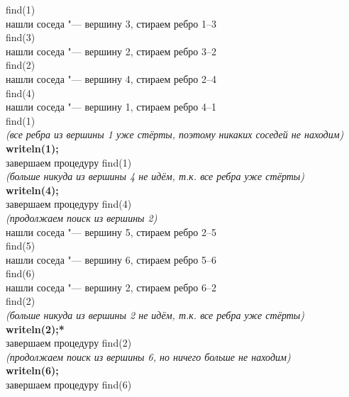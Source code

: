 {\newcommand{\ind}{\hspace*{1cm}}\footnotesize\noindent
find(1)\\
нашли соседа "--- вершину 3, стираем ребро 1--3\\
\ind find(3)\\
\ind нашли соседа "--- вершину 2, стираем ребро 3--2\\
\ind \ind find(2)\\
\ind \ind нашли соседа "--- вершину 4, стираем ребро 2--4\\
\ind \ind \ind find(4)\\
\ind \ind \ind нашли соседа "--- вершину 1, стираем ребро 4--1\\
\ind \ind \ind \ind find(1)\\
\ind \ind \ind \ind \textit{(все ребра из вершины 1 уже стёрты, поэтому 
                                      никаких соседей не находим)}\\
\ind \ind \ind \ind \textbf{writeln(1);}\\
\ind \ind \ind \ind завершаем процедуру find(1)\\
\ind \ind \ind \textit{(больше никуда из вершины 4 не идём, т.к. все ребра уже стёрты)}\\
\ind \ind \ind \textbf{writeln(4);}\\
\ind \ind \ind завершаем процедуру find(4)\\
\ind \ind \textit{(продолжаем поиск из вершины 2)}\\
\ind \ind нашли соседа "--- вершину 5, стираем ребро 2--5\\
\ind \ind \ind find(5)\\
\ind \ind \ind нашли соседа "--- вершину 6, стираем ребро 5--6\\
\ind \ind \ind \ind find(6)\\
\ind \ind \ind \ind нашли соседа "--- вершину 2, стираем ребро 6--2\\
\ind \ind \ind \ind \ind find(2)\\
\ind \ind \ind \ind \ind \textit{(больше никуда из вершины 2 не идём, т.к. все ребра уже стёрты)}\\
\ind \ind \ind \ind \ind \textbf{writeln(2);*}\\
\ind \ind \ind \ind \ind завершаем процедуру find(2)\\
\ind \ind \ind \ind \textit{(продолжаем поиск из вершины 6, но ничего больше не находим)}\\
\ind \ind \ind \ind \textbf{writeln(6);}\\
\ind \ind \ind \ind завершаем процедуру find(6)\\
}
